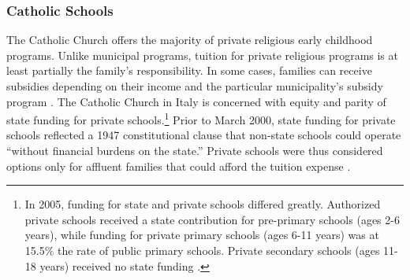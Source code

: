 \subsubsection{Catholic Schools}
The Catholic Church offers the majority of private religious early childhood programs. Unlike municipal programs, tuition for private religious programs is at least partially the family's responsibility. In some cases, families can receive subsidies depending on their income and the particular municipality's subsidy program \citep{Hohnerlein_2009_Paradox-Public-Preschools}.  The Catholic Church in Italy is concerned with equity and parity of state funding for private schools.\footnote{In 2005, funding for state and private schools differed greatly. Authorized private schools received a state contribution for pre-primary schools (ages 2-6 years), while funding for private primary schools (ages 6-11 years) was at 15.5\% the rate of public primary schools. Private secondary schools (ages 11-18 years) received no state funding \citep{Becchi-Ferrari_1990_Pub-Inf-Centres-Italy}.} Prior to March 2000, state funding for private schools reflected a 1947 constitutional clause that non-state schools could operate ``without financial burdens on the state.'' Private schools were thus considered options only for affluent families that could afford the tuition expense \citep{Hohnerlein_2009_Paradox-Public-Preschools}.
